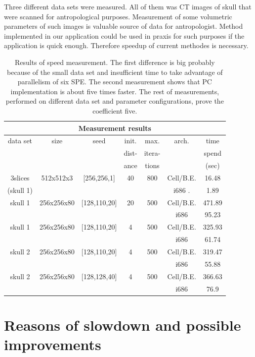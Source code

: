 Three different data sets were measured.
All of them was CT images of skull that were scanned for antropological purposes.
Measurement of some volumetric parameters of such images is valuable source of data for antropologist.
Method implemented in our application could be used in praxis for such purposes if the application is quick enough.
Therefore speedup of current methodes is necessary.

\begin{table}
\centering
\begin{tabular}{|c|c|c|c|c|c|c|}
\hline
\multicolumn{7}{|c|}{Measurement results}\\
\hline
data set		&size		&seed		&init.		&max. 		&arch.		&time\\
			&		&		&dist-		&itera-		&		&spend\\
			&		&		&ance		&tions		&		&(sec)\\
\hline
\hline
3slices 		&512x512x3	&[256,256,1]	&40		&800		&Cell/B.E.	&16.48\\
(skull 1)		&		&		&		&		&i686	.	&1.89\\
\hline
\hline
skull 1			&256x256x80	&[128,110,20]	&20		&500		&Cell/B.E.	&471.89\\
			&		&		&		&		&i686		&95.23\\
\hline
\hline
skull 1			&256x256x80	&[128,110,20]	&4		&500		&Cell/B.E.	&325.93\\
			&		&		&		&		&i686		&61.74\\
\hline
\hline
skull 2			&256x256x80	&[128,110,20]	&4		&500		&Cell/B.E.	&319.47\\
			&		&		&		&		&i686		&55.88\\
\hline
\hline
skull 2			&256x256x80	&[128,128,40]	&4		&500		&Cell/B.E.	&366.63\\
			&		&		&		&		&i686		&76.9\\
\hline
\end{tabular}
\par
\caption[Measurement results]
{
Results of speed measurement.
The first difference is big probably because of the small data set and insufficient time to take advantage of parallelism of six SPE.
The second measurement shows that PC implementation is about five times faster.
The rest of measurements, performed on different data set and parameter configurations, prove the coefficient five.
}
\label{tab:runresults}
\end{table}

\section{Reasons of slowdown and possible improvements}

